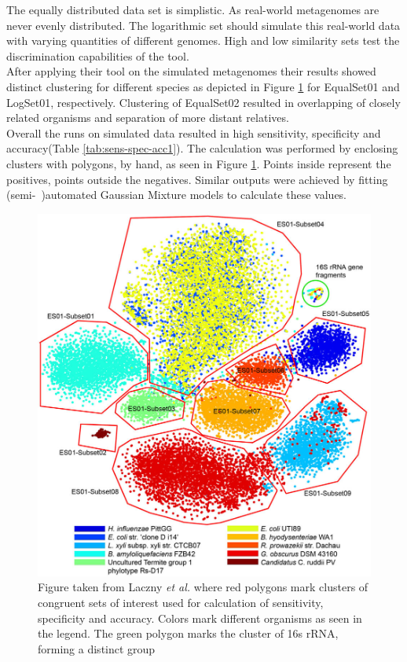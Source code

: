 \documentclass[twocolumn]{bmcart}%
\begin{document}
The equally distributed data set is simplistic. As real-world metagenomes are never evenly distributed. The logarithmic set should simulate this real-world data with varying quantities of different genomes. High and low similarity sets test the discrimination capabilities of the tool.\\
After applying their tool on the simulated metagenomes their results showed distinct clustering for different species as depicted in Figure \ref{img:clusterData1} for EqualSet01 and LogSet01, respectively. Clustering of EqualSet02 resulted in overlapping of closely related organisms and separation of more distant relatives. \\
Overall the runs on simulated data resulted in high sensitivity, specificity and accuracy(Table \ref{tab:sens-spec-acc1}). The calculation was performed by enclosing clusters with polygons, by hand, as seen in Figure \ref{img:clusterData1}. Points inside represent the positives, points outside the negatives. Similar outputs were achieved by fitting (semi-~)automated Gaussian Mixture models to calculate these values.
\begin{figure}[p]
	\centering
	\includegraphics[width=.98\linewidth]{bilder/clusterData1.jpg}
	\caption{Figure taken from Laczny \textit{et al.} \cite{Laczny2014} where red polygons mark clusters of congruent sets of interest used for calculation of sensitivity, specificity and accuracy. Colors mark different organisms as seen in the legend. The green polygon marks the cluster of 16s rRNA, forming a distinct group}
	\label{img:clusterData1}
\end{figure}%
\end{document}
